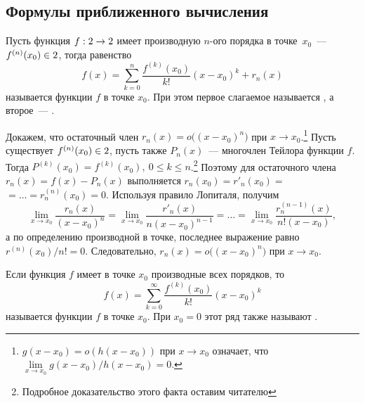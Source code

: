 \subsection{Формулы приближенного вычисления}
\label{sec:form}

Пусть функция $f: 2 \rightarrow 2$ имеет производную $n$-ого порядка в точке~$x_0$~--- $f^{(n)}(x_0) \in 2$, тогда равенство
\begin{equation}
    f(x) = \sum\limits_{k=0}^{n} \frac{f^{(k)}(x_0)}{k!} (x - x_0)^k + r_n(x)
    \label{eq:taylor-formula}
\end{equation}
называется  функции $f$ в точке $x_0$. При этом первое слагаемое называется , а второе~--- .

Докажем, что остаточный член $r_n(x) = o\big( (x - x_0)^n \big)$ при $x \rightarrow x_0$.\footnote{$g(x - x_0) = o(h(x - x_0))$ при $x \rightarrow x_0$ означает, что $\lim\limits_{x \rightarrow x_0} g(x - x_0) / h(x - x_0) = 0$.} Пусть существует $f^{(n)} (x_0) \in 2$, пусть также $P_n(x)$~--- многочлен Тейлора функции $f$. Тогда $P^{(k)}(x_0) = f^{(k)}(x_0), ~ 0 \leqslant k \leqslant n$.\footnote{Подробное доказательство этого факта оставим читателю} Поэтому для остаточного члена $r_n(x) = f(x) - P_n(x)$ выполняется $r_n(x_0) = r'_n(x_0) =$ $= \ldots = r_n^{(n)}(x_0) = 0$. Используя правило Лопиталя, получим
\begin{equation*}
    \lim_{x \rightarrow x_0} \frac{r_n(x)}{(x - x_0)^n}
        = \lim_{x \rightarrow x_0} \frac{r'_n(x)}{n (x - x_0)^{n-1}}
        = \ldots
        = \lim_{x \rightarrow x_0} \frac{r^{(n-1)}_n(x)}{n!(x - x_0)},
\end{equation*}
а по определению производной в точке, последнее выражение равно $r^{(n)}(x_0) / n! = 0$. Следовательно, $r_n(x) = o\big( (x - x_0)^n \big)$ при $x \rightarrow x_0$.

Если функция $f$ имеет в точке $x_0$ производные всех порядков, то
\begin{equation}
    f(x) = \sum\limits_{k=0}^{\infty} \frac{f^{(k)}(x_0)}{k!} (x - x_0)^k
    \label{eq:taylor-series}
\end{equation}
называется  функции $f$ в точке $x_0$. При $x_0 = 0$ этот ряд также называют .

